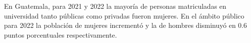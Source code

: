 En Guatemala, para 2021 y 2022 la mayoría de personas matriculadas en universidad tanto públicas como privadas fueron mujeres. En el ámbito público para 2022 la población de mujeres incrementó y la de hombres disminuyó en 0.6 puntos porcentuales respectivamente. 
